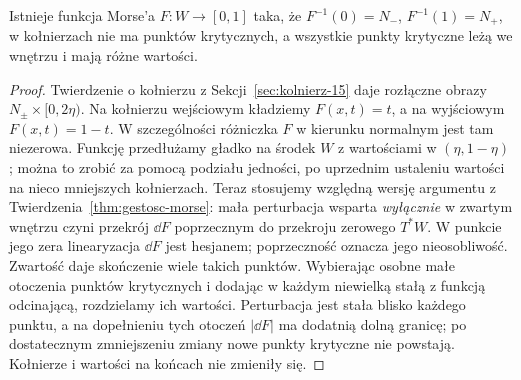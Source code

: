 \begin{stwierdzenie}
\label{prop:morse-kobordyzm-18}
Istnieje funkcja Morse'a
$F:W\to[0,1]$ taka, że
$F^{-1}(0)=N_-$, $F^{-1}(1)=N_+$,
w kołnierzach nie ma punktów krytycznych,
a wszystkie punkty krytyczne leżą we wnętrzu
i mają różne wartości.
\end{stwierdzenie}
\begin{proof}
Twierdzenie o kołnierzu z
Sekcji~\ref{sec:kolnierz-15} daje rozłączne
obrazy $N_\pm\times[0,2\eta)$.
Na kołnierzu wejściowym kładziemy $F(x,t)=t$,
a na wyjściowym $F(x,t)=1-t$.
W szczególności różniczka $F$ w kierunku
normalnym jest tam niezerowa.
Funkcję przedłużamy gładko na środek $W$
z wartościami w $(\eta,1-\eta)$; można to
zrobić za pomocą podziału jedności, po
uprzednim ustaleniu wartości na nieco mniejszych
kołnierzach. Teraz stosujemy względną wersję
argumentu z Twierdzenia~\ref{thm:gestosc-morse}:
mała perturbacja wsparta \emph{wyłącznie}
w zwartym wnętrzu czyni przekrój $\dd F$
poprzecznym do przekroju zerowego $T^*W$.
W punkcie jego zera linearyzacja $\dd F$
jest hesjanem; poprzeczność oznacza jego
nieosobliwość. Zwartość daje skończenie wiele
takich punktów. Wybierając osobne małe
otoczenia punktów krytycznych i dodając
w każdym niewielką stałą z funkcją odcinającą,
rozdzielamy ich wartości. Perturbacja jest
stała blisko każdego punktu, a na dopełnieniu
tych otoczeń $|\dd F|$ ma dodatnią dolną
granicę; po dostatecznym zmniejszeniu zmiany
nowe punkty krytyczne nie powstają.
Kołnierze i wartości na końcach nie zmieniły się.
\end{proof}

